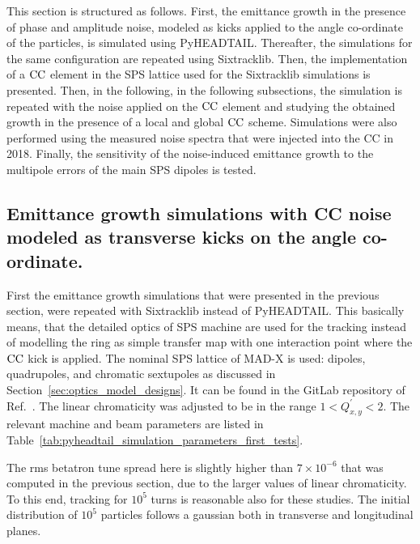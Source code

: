 This section is structured as follows. First, the emittance growth in the presence of phase and amplitude noise, modeled as kicks applied to the angle co-ordinate of the particles, is simulated using PyHEADTAIL. Thereafter, the simulations for the same configuration are repeated using Sixtracklib. Then, the implementation of a ${\mathrm{CC}}$ element in the SPS lattice used for the Sixtracklib simulations is presented. Then, in the following, in the following subsections, the simulation is repeated with the noise applied on the ${\mathrm{CC}}$ element and studying the obtained growth in the presence of a local and global ${\mathrm{CC}}$ scheme. Simulations were also performed using the measured noise spectra that were injected into the CC in 2018. Finally, the sensitivity of the noise-induced emittance growth to the multipole errors of the main SPS dipoles is tested.

\subsection{Emittance growth simulations with CC noise modeled as transverse kicks on the angle co-ordinate.}\label{subsec:sixtracklib_kicks_transverse_angle}

First the emittance growth simulations that were presented in the previous section, were repeated with Sixtracklib instead of PyHEADTAIL. This basically means, that the detailed optics of SPS machine are used for the tracking instead of modelling the ring as simple transfer map with one interaction point where the ${\mathrm{CC}}$  kick is applied. The nominal SPS lattice of MAD-X is used: dipoles, quadrupoles, and chromatic sextupoles as discussed in Section~\ref{sec:optics_model_designs}. It can be found in the GitLab repository of Ref.~\cite{cern_optics_repo}. The linear chromaticity was adjusted to be in the range $1 < Q^\prime_{x,y} < 2$. The relevant machine and beam parameters are listed in Table~\ref{tab:pyheadtail_simulation_parameters_first_tests}.

The rms betatron tune spread here is slightly higher than $7 \times 10^{-6}$ that was computed in the previous section, due to the larger values of linear chromaticity. To this end, tracking for $10^{5}$ turns is reasonable also for these studies. The initial distribution of $10^5$ particles follows a gaussian both in transverse and longitudinal planes.

